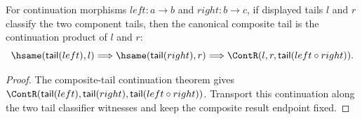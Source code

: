 \begin{theorem}
\label{thm:continuation-morphism-tail-factorization-transport-cont}
For continuation morphisms $left:a\to b$ and $right:b\to c$, if displayed
tails $l$ and $r$ classify the two component tails, then the canonical
composite tail is the continuation product of $l$ and $r$:
$$
\hsame(\mathsf{tail}(left),l)
\Longrightarrow
\hsame(\mathsf{tail}(right),r)
\Longrightarrow
\ContR(l,r,\mathsf{tail}(left\circ right)).
$$
\end{theorem}
\begin{proof}
The composite-tail continuation theorem gives
$\ContR(\mathsf{tail}(left),\mathsf{tail}(right),
\mathsf{tail}(left\circ right))$. Transport this continuation along the two
tail classifier witnesses and keep the composite result endpoint fixed.
\end{proof}
